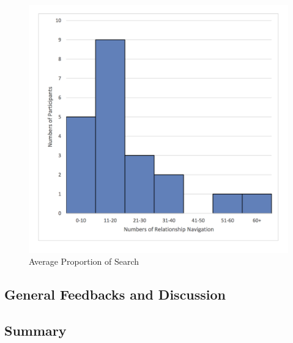 \begin{figure}[!h]
\begin{centering}
\includegraphics[scale=0.68]{pics/relationship_navigation_histogram.png}
\caption{Average Proportion of Search}\label{fig:relationship_navigation_histogram}
\end{centering}
\end{figure}

\subsection{General Feedbacks and Discussion}\label{results_feedbacks}
\subsection{Summary}\label{results_summary}



